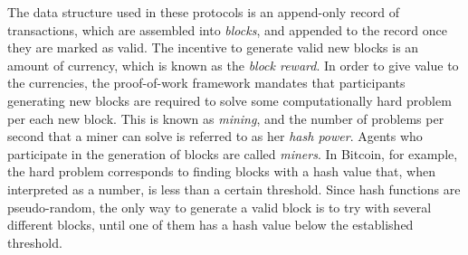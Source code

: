 \documentclass[a4paper,english,cleveref, autoref,numberwithinsect]{lipics-v2019}
\begin{document}
The data structure used in these protocols is an append-only record of transactions, which are assembled into \emph{blocks}, and appended to the record once they 
are marked as valid. The incentive to generate valid new blocks is an amount of currency, which is known as the \emph{block reward}. 
In order to give value to the currencies, the 
proof-of-work framework mandates that participants generating new blocks are required to solve some computationally hard problem per each new block.  This is known as \emph{mining}, and the number of problems per second that a miner can solve is referred to as her \emph{hash power}. Agents who participate in the generation of blocks are called \emph{miners}. In Bitcoin, for example, the hard problem corresponds to finding blocks with a hash value that, when interpreted as a number, is less than a certain threshold. Since hash functions are pseudo-random, the only way to generate a valid block is to try with several different blocks, until one of them has a hash value below the established threshold. 
\end{document}
